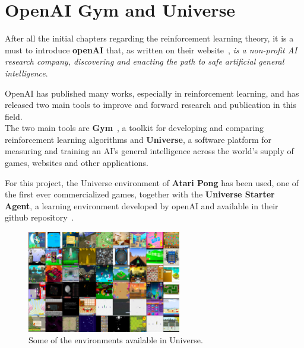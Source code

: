 \chapter{OpenAI Gym and Universe}
\label{chapter4}

\begin{quotation}
    {\footnotesize
    \begin{flushright}
    \end{flushright}}
\end{quotation}

\vspace{0.5cm}

\noindent After all the initial chapters regarding the reinforcement learning theory, it is a must to introduce \textbf{openAI} that, as written on their website~\cite{openAI}, \textit{is a non-profit AI research company, discovering and enacting the path to safe
artificial general intelligence}.

OpenAI has published many works, especially in reinforcement learning, and has released two main tools to improve and forward research and publication in this field. \\
The two main tools are \textbf{Gym}~\cite{gym}, a toolkit for developing and comparing reinforcement learning algorithms and \textbf{Universe}, a software platform for measuring and training an AI’s general intelligence across the world’s supply of games, websites and other applications.

For this project, the Universe environment of \textbf{Atari Pong} has been used, one of the first ever commercialized games, together with the \textbf{Universe Starter Agent}, a learning environment developed by openAI and available in their github repository~\cite{universe-starter-agent}.
\begin{figure}
    \centering
    \includegraphics[width=0.6\textwidth]{./pictures/universe.eps}
    \caption{Some of the environments available in Universe.}
    \label{fig:universe}
\end{figure}

